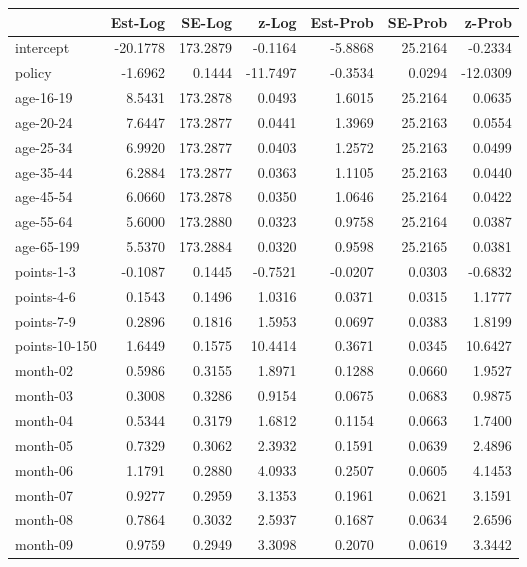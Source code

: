 \documentclass[10pt]{article}
\begin{document}
\begin{table}[ht]
\centering
\begin{tabular}{lrrrrrr}
  \hline
 & Est-Log & SE-Log & z-Log & Est-Prob & SE-Prob & z-Prob \\ 
  \hline
intercept & -20.1778 & 173.2879 & -0.1164 & -5.8868 & 25.2164 & -0.2334 \\ 
  policy & -1.6962 & 0.1444 & -11.7497 & -0.3534 & 0.0294 & -12.0309 \\ 
  age-16-19 & 8.5431 & 173.2878 & 0.0493 & 1.6015 & 25.2164 & 0.0635 \\ 
  age-20-24 & 7.6447 & 173.2877 & 0.0441 & 1.3969 & 25.2163 & 0.0554 \\ 
  age-25-34 & 6.9920 & 173.2877 & 0.0403 & 1.2572 & 25.2163 & 0.0499 \\ 
  age-35-44 & 6.2884 & 173.2877 & 0.0363 & 1.1105 & 25.2163 & 0.0440 \\ 
  age-45-54 & 6.0660 & 173.2878 & 0.0350 & 1.0646 & 25.2164 & 0.0422 \\ 
  age-55-64 & 5.6000 & 173.2880 & 0.0323 & 0.9758 & 25.2164 & 0.0387 \\ 
  age-65-199 & 5.5370 & 173.2884 & 0.0320 & 0.9598 & 25.2165 & 0.0381 \\ 
  points-1-3 & -0.1087 & 0.1445 & -0.7521 & -0.0207 & 0.0303 & -0.6832 \\ 
  points-4-6 & 0.1543 & 0.1496 & 1.0316 & 0.0371 & 0.0315 & 1.1777 \\ 
  points-7-9 & 0.2896 & 0.1816 & 1.5953 & 0.0697 & 0.0383 & 1.8199 \\ 
  points-10-150 & 1.6449 & 0.1575 & 10.4414 & 0.3671 & 0.0345 & 10.6427 \\ 
  month-02 & 0.5986 & 0.3155 & 1.8971 & 0.1288 & 0.0660 & 1.9527 \\ 
  month-03 & 0.3008 & 0.3286 & 0.9154 & 0.0675 & 0.0683 & 0.9875 \\ 
  month-04 & 0.5344 & 0.3179 & 1.6812 & 0.1154 & 0.0663 & 1.7400 \\ 
  month-05 & 0.7329 & 0.3062 & 2.3932 & 0.1591 & 0.0639 & 2.4896 \\ 
  month-06 & 1.1791 & 0.2880 & 4.0933 & 0.2507 & 0.0605 & 4.1453 \\ 
  month-07 & 0.9277 & 0.2959 & 3.1353 & 0.1961 & 0.0621 & 3.1591 \\ 
  month-08 & 0.7864 & 0.3032 & 2.5937 & 0.1687 & 0.0634 & 2.6596 \\ 
  month-09 & 0.9759 & 0.2949 & 3.3098 & 0.2070 & 0.0619 & 3.3442 \\ 

\end{tabular}
\end{table}
\end{document}
